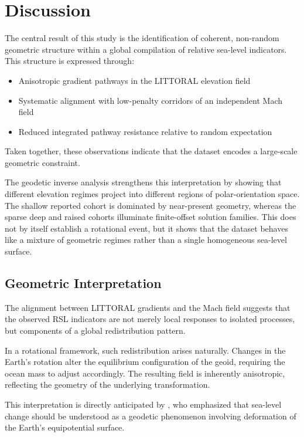 \documentclass[twocolumn,10pt]{article}
\begin{document}
\section{Discussion}

The central result of this study is the identification of coherent, non-random geometric structure within a global compilation of relative sea-level indicators. This structure is expressed through:

\begin{itemize}
\item Anisotropic gradient pathways in the LITTORAL elevation field
\item Systematic alignment with low-penalty corridors of an independent Mach field
\item Reduced integrated pathway resistance relative to random expectation
\end{itemize}

Taken together, these observations indicate that the dataset encodes a large-scale geometric constraint.

The geodetic inverse analysis strengthens this interpretation by showing that different elevation regimes project into different regions of polar-orientation space. The shallow reported cohort is dominated by near-present geometry, whereas the sparse deep and raised cohorts illuminate finite-offset solution families. This does not by itself establish a rotational event, but it shows that the dataset behaves like a mixture of geometric regimes rather than a single homogeneous sea-level surface.

\subsection{Geometric Interpretation}

The alignment between LITTORAL gradients and the Mach field suggests that the observed RSL indicators are not merely local responses to isolated processes, but components of a global redistribution pattern.

In a rotational framework, such redistribution arises naturally. Changes in the Earth's rotation alter the equilibrium configuration of the geoid, requiring the ocean mass to adjust accordingly. The resulting field is inherently anisotropic, reflecting the geometry of the underlying transformation.

This interpretation is directly anticipated by \citet{fairbridge1961}, who emphasized that sea-level change should be understood as a geodetic phenomenon involving deformation of the Earth's equipotential surface.
\end{document}
